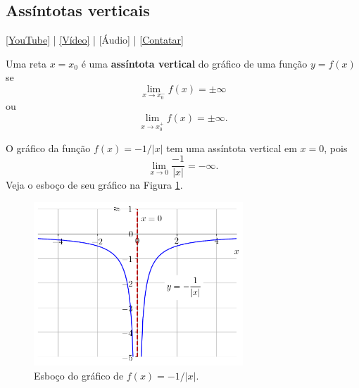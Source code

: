 \subsection{Assíntotas verticais}

\begin{flushright}
  \href{https://youtu.be/5OFKyRGG9lU}{[YouTube]} | \href{https://archive.org/details/video_20220727}{[Vídeo]} | [Áudio] | \href{https://phkonzen.github.io/notas/contato.html}{[Contatar]}
\end{flushright}

Uma reta $x=x_0$ é uma {\bf assíntota vertical} do gráfico de uma função $y = f(x)$ se
\begin{equation}
  \lim_{x\to x_0^-} f(x) = \pm\infty
\end{equation}
ou
\begin{equation}
  \lim_{x\to x_0^+} f(x) = \pm\infty.
\end{equation}

\begin{ex}
  O gráfico da função $f(x)=-1/|x|$ tem uma assíntota vertical em $x=0$, pois
  \begin{equation}
    \lim_{x\to 0} \frac{-1}{|x|} = -\infty.
  \end{equation}
  Veja o esboço de seu gráfico na Figura \ref{fig:ex_lim_assvert_1}.

  \begin{figure}[H]
    \centering
    \includegraphics[width=0.7\textwidth]{./cap_lim/dados/fig_ex_lim_assvert_1/fig}
    \caption{Esboço do gráfico de $f(x)=-1/|x|$.}
    \label{fig:ex_lim_assvert_1}
  \end{figure}  
\end{ex}

